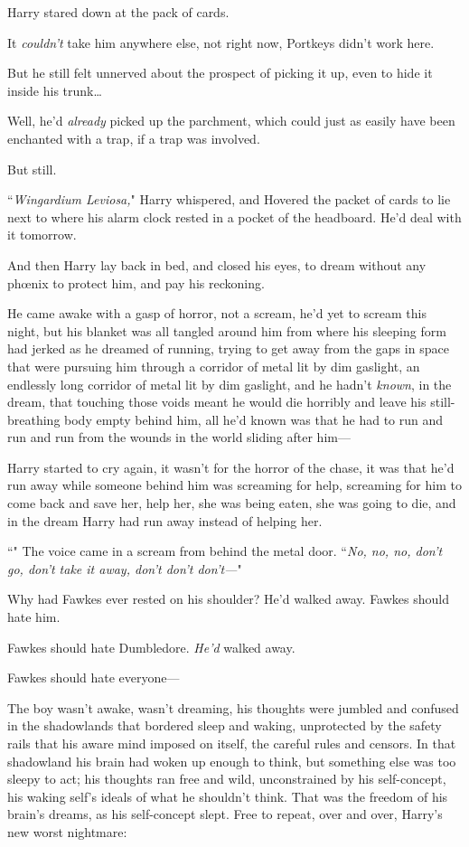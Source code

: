 Harry stared down at the pack of cards.

It \emph{couldn't} take him anywhere else, not right now, Portkeys didn't work here.

But he still felt unnerved about the prospect of picking it up, even to hide it inside his trunk{\ldots}

Well, he'd \emph{already} picked up the parchment, which could just as easily have been enchanted with a trap, if a trap was involved.

But still.

``\emph{Wingardium Leviosa,}" Harry whispered, and Hovered the packet of cards to lie next to where his alarm clock rested in a pocket of the headboard. He'd deal with it tomorrow.

And then Harry lay back in bed, and closed his eyes, to dream without any phœnix to protect him, and pay his reckoning.

\later

He came awake with a gasp of horror, not a scream, he'd yet to scream this night, but his blanket was all tangled around him from where his sleeping form had jerked as he dreamed of running, trying to get away from the gaps in space that were pursuing him through a corridor of metal lit by dim gaslight, an endlessly long corridor of metal lit by dim gaslight, and he hadn't \emph{known}, in the dream, that touching those voids meant he would die horribly and leave his still-breathing body empty behind him, all he'd known was that he had to run and run and run from the wounds in the world sliding after him—

Harry started to cry again, it wasn't for the horror of the chase, it was that he'd run away while someone behind him was screaming for help, screaming for him to come back and save her, help her, she was being eaten, she was going to die, and in the dream Harry had run away instead of helping her.

``" The voice came in a scream from behind the metal door. ``\emph{No, no, no, don't go, don't take it away, don't don't don't—}"

Why had Fawkes ever rested on his shoulder? He'd walked away. Fawkes should hate him.

Fawkes should hate Dumbledore. \emph{He'd} walked away.

Fawkes should hate everyone—

The boy wasn't awake, wasn't dreaming, his thoughts were jumbled and confused in the shadowlands that bordered sleep and waking, unprotected by the safety rails that his aware mind imposed on itself, the careful rules and censors. In that shadowland his brain had woken up enough to think, but something else was too sleepy to act; his thoughts ran free and wild, unconstrained by his self-concept, his waking self's ideals of what he shouldn't think. That was the freedom of his brain's dreams, as his self-concept slept. Free to repeat, over and over, Harry's new worst nightmare:

